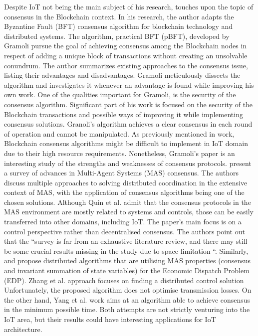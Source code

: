 \documentclass[oneside,12pt]{book}
\begin{document}
Despite IoT not being the main subject of his research, \cite{GRAMOLI2020760} touches upon the topic of consensus in the Blockchain context. In his research, the author adapts the Byzantine Fault (BFT) consensus algorithm for blockchain technology and distributed systems. The algorithm, practical BFT (pBFT), developed by Gramoli pursue the goal of achieving consensus among the Blockchain nodes in respect of adding a unique block of transactions without creating an unsolvable conundrum. The author summarizes existing approaches to the consensus issue, listing their advantages and disadvantages. Gramoli meticulously dissects the algorithm and investigates it whenever an advantage is found while improving his own work. One of the qualities important for Gramoli, is the security of the consensus algorithm. Significant part of his work is focused on the security of the Blockchain transactions and possible ways of improving it while implementing consensus solutions. Granoli’s algorithm achieves a clear consensus in each round of operation and cannot be manipulated. As previously mentioned in \cite{SALIMITARI2020100212} work, Blockchain consensus algorithms might be difficult to implement in IoT domain due to their high resource requirements. Nonetheless, Gramoli’s paper is an interesting study of the strengths and weaknesses of consensus protocols.\smallskip \newline
\cite{7776972} present a survey of advances in Multi-Agent Systems (MAS) consensus. The authors discuss multiple approaches to solving distributed coordination in the extensive context of MAS, with the application of consensus algorithms being one of the chosen solutions. Although Quin et al. admit that the consensus protocols in the MAS environment are mostly related to systems and controls, those can be easily transferred into other domains, including IoT.   The paper’s main focus is on a control perspective rather than decentralised consensus. The authors point out that the “survey is far from an exhaustive literature review, and there may still be some crucial results missing in the study due to space limitation “.\smallskip \newline
Similarly, \cite{6810888} and \cite{7339456} propose distributed algorithms that are utilising MAS properties (consensus and invariant summation of state variables) for the Economic Dispatch Problem (EDP). Zhang et al. approach focuses on finding a distributed control solution Unfortunately, the proposed algorithm does not optimise transmission losses. On the other hand, Yang et al. work aims at an algorithm able to achieve consensus in the minimum possible time.  Both attempts are not strictly venturing into the IoT area, but their results could have interesting applications for IoT architecture.\smallskip \newline
\end{document}
